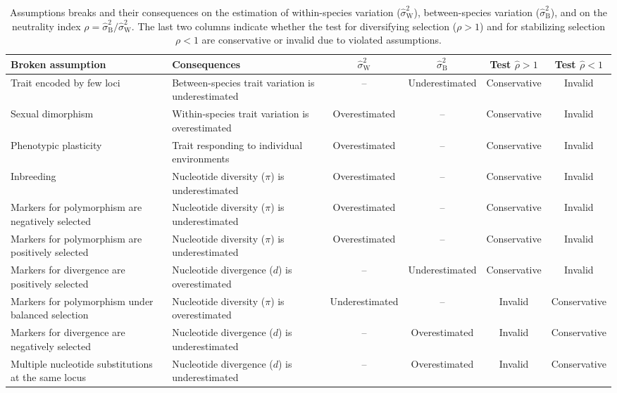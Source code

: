 \documentclass{article}
\newcommand{\EstRateBetween}{\widehat{\sigma}^2_{\mathrm{B}}}
\newcommand{\EstRateWhithin}{\widehat{\sigma}^2_{\mathrm{W}}}
\newcommand{\NI}{\rho}
\newcommand{\EstNI}{\widehat{\rho}}
\begin{document}
\begin{table}[t!]
    \centering
    \begin{adjustbox}{width = 1.0\textwidth}
        \begin{tabular}{||l|l||c|c||c|c||}
            \hline
            Broken assumption                                       & Consequences                                       & $\EstRateWhithin$   & $\EstRateBetween$   & Test $\EstNI > 1$ & Test $\EstNI < 1$ \\ \hline \hline
            Trait encoded by few loci                        & Between-species trait variation is underestimated & --              & Underestimated & Conservative & Invalid  \\ \hline
            Sexual dimorphism                                & Within-species trait variation is overestimated   & Overestimated & -- & Conservative & Invalid  \\ \hline
            Phenotypic plasticity & Trait responding to individual environments  & Overestimated & -- & Conservative & Invalid  \\ \hline
            Inbreeding                                       & Nucleotide diversity ($\pi$) is underestimated    & Overestimated  & --              & Conservative & Invalid  \\ \hline
            Markers for polymorphism are negatively selected & Nucleotide diversity ($\pi$) is underestimated  & Overestimated & -- & Conservative & Invalid  \\ \hline
            Markers for polymorphism are positively selected & Nucleotide diversity ($\pi$) is underestimated  & Overestimated & -- & Conservative & Invalid  \\ \hline
            Markers for divergence are positively selected   & Nucleotide divergence ($d$) is overestimated & -- & Underestimated & Conservative & Invalid  \\ \hline
            Markers for polymorphism under balanced selection & Nucleotide diversity ($\pi$) is overestimated  & Underestimated & -- & Invalid & Conservative  \\ \hline
            Markers for divergence are negatively selected   & Nucleotide divergence ($d$) is underestimated & -- & Overestimated & Invalid & Conservative  \\ \hline
            Multiple nucleotide substitutions at the same locus & Nucleotide divergence ($d$) is underestimated & -- & Overestimated & Invalid & Conservative  \\\hline \hline
        \end{tabular}
    \end{adjustbox}
    \caption{Assumptions breaks and their consequences on the estimation of within-species variation ($\EstRateWhithin$), between-species variation ($\EstRateBetween$), and on the neutrality index $\NI = \EstRateBetween/\EstRateWhithin$.
    The last two columns indicate whether the test for diversifying selection ($\NI > 1$) and for stabilizing selection $\NI < 1$ are conservative or invalid due to violated assumptions.
    }
    \label{table:assumptions}
\end{table}
\end{document}
